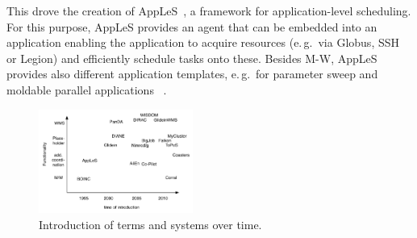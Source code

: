 \documentclass{sig-alternate}
\begin{document}
This drove the creation of AppLeS~\cite{Berman:1996:apples}, a framework for
application-level scheduling.
For this purpose, AppLeS provides an agent that can be embedded into an
application enabling the application to acquire resources (e.\,g.\ via Globus,
SSH or Legion) and efficiently schedule tasks onto these.
Besides M-W, AppLeS provides also different application templates, e.\,g.\ for
parameter sweep and moldable parallel applications
~\cite{Berman:2003:ACG:766629.766632}.


%


%
% 

\begin{figure}[t]
    \centering
        \includegraphics[width=0.45\textwidth]{figures/timeline}
                \caption{Introduction of terms and systems over
                  time. }
\end{figure}
\end{document}
